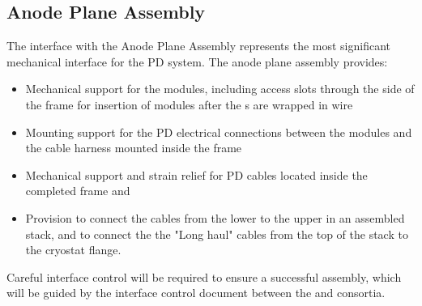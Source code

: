 \subsection{Anode Plane Assembly}

The interface with the Anode Plane Assembly represents the most significant mechanical interface for the PD system.  The anode plane assembly provides:

\begin{itemize}

\item Mechanical support for the  modules, including access slots through the side of the frame for insertion of modules after the s are wrapped in wire

\item Mounting support for the PD electrical connections between the  modules and the cable harness mounted inside the  frame

\item Mechanical support and strain relief for PD cables located inside the completed  frame and

\item Provision to connect the  cables from the lower  to the upper  in an assembled  stack, and to connect the the "Long haul" cables from the top of the  stack to the cryostat flange.

\end{itemize}

Careful interface control will be required to ensure a successful assembly, which will be guided by the interface control document between the  and  consortia.





